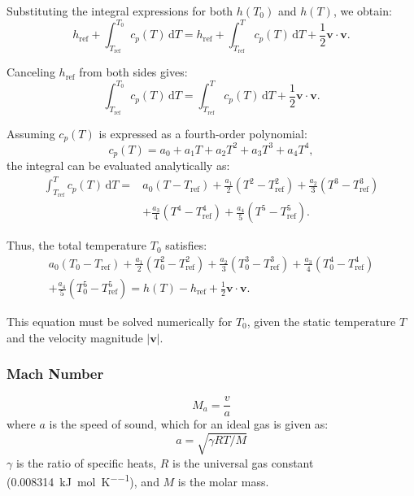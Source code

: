 \documentclass[12pt]{extarticle}
\newcommand{\<}{\langle}
\renewcommand{\>}{\rangle}
\theoremstyle{definition}
\begin{document}
Substituting the integral expressions for both \( h(T_0) \) and \( h(T) \), we obtain:
\begin{equation}
    h_{\text{ref}} + \int_{T_{\text{ref}}}^{T_0} c_p(T) \, \mathrm{d}T
    = h_{\text{ref}} + \int_{T_{\text{ref}}}^{T} c_p(T) \, \mathrm{d}T + \frac{1}{2} \mathbf{v} \cdot \mathbf{v}.
\end{equation}

Canceling \( h_{\text{ref}} \) from both sides gives:
\begin{equation}
    \int_{T_{\text{ref}}}^{T_0} c_p(T) \, \mathrm{d}T
    = \int_{T_{\text{ref}}}^{T} c_p(T) \, \mathrm{d}T + \frac{1}{2} \mathbf{v} \cdot \mathbf{v}.
\end{equation}

Assuming \( c_p(T) \) is expressed as a fourth-order polynomial:
\[
    c_p(T) = a_0 + a_1 T + a_2 T^2 + a_3 T^3 + a_4 T^4,
\]
the integral can be evaluated analytically as:
\begin{align}
    \int_{T_{\text{ref}}}^{T} c_p(T) \, \mathrm{d}T
    ={}& a_0 (T - T_{\text{ref}}) + \frac{a_1}{2}(T^2 - T_{\text{ref}}^2)
    + \frac{a_2}{3}(T^3 - T_{\text{ref}}^3) \nonumber \\
    & + \frac{a_3}{4}(T^4 - T_{\text{ref}}^4)
    + \frac{a_4}{5}(T^5 - T_{\text{ref}}^5).
\end{align}

Thus, the total temperature \( T_0 \) satisfies:
\begin{align}
    a_0 (T_0 - T_{\text{ref}}) + \frac{a_1}{2}(T_0^2 - T_{\text{ref}}^2)
    + \frac{a_2}{3}(T_0^3 - T_{\text{ref}}^3)
    + \frac{a_3}{4}(T_0^4 - T_{\text{ref}}^4) \nonumber \\
    + \frac{a_4}{5}(T_0^5 - T_{\text{ref}}^5)
    = h(T) - h_{\text{ref}} + \frac{1}{2} \mathbf{v} \cdot \mathbf{v}.
\end{align}

This equation must be solved numerically for \( T_0 \), given the static temperature \( T \) and the velocity magnitude \( |\mathbf{v}| \).


\subsubsection{Mach Number}
\begin{equation}
    M_a = \frac{v}{a}
\end{equation}
where $a$ is the speed of sound, which for an ideal gas is given as:
\begin{equation}
    a = \sqrt{\gamma R T / M}
\end{equation}
$\gamma$ is the ratio of specific heats, $R$ is the universal gas constant (\SI{0.008314}{\kilo\joule\per\mol\per\kelvin}), and $M$ is the molar mass.
\end{document}

